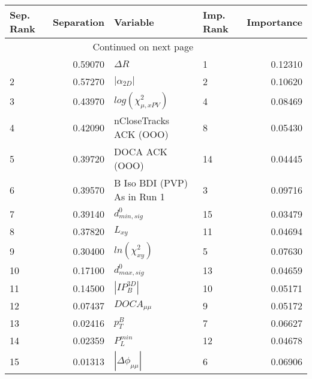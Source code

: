 \usepackage{lscape}

\begin{landscape}
\begin{longtable}{lrllr}
\toprule
Sep. Rank &  Separation &                     Variable & Imp. Rank &  Importance \\
\midrule
\endhead
\midrule
\multicolumn{3}{r}{{Continued on next page}} \\
\midrule
\endfoot

\bottomrule
\endlastfoot
        1 &     0.59070 &                   $\Delta R$ &         1 &     0.12310 \\
        2 &     0.57270 &              $|\alpha_{2D}|$ &         2 &     0.10620 \\
        3 &     0.43970 &    $log(\chi^{2}_{\mu,xPV})$ &         4 &     0.08469 \\
        4 &     0.42090 &       nCloseTracks ACK (OOO) &         8 &     0.05430 \\
        5 &     0.39720 &               DOCA ACK (OOO) &        14 &     0.04445 \\
        6 &     0.39570 &  B Iso BDI (PVP) As in Run 1 &         3 &     0.09716 \\
        7 &     0.39140 &             $d^0_{min, sig}$ &        15 &     0.03479 \\
        8 &     0.37820 &                     $L_{xy}$ &        11 &     0.04694 \\
        9 &     0.30400 &          $ln(\chi^{2}_{xy})$ &         5 &     0.07630 \\
       10 &     0.17100 &             $d^0_{max, sig}$ &        13 &     0.04659 \\
       11 &     0.14500 &              $|IP_{B}^{3D}|$ &        10 &     0.05171 \\
       12 &     0.07437 &              $DOCA_{\mu\mu}$ &         9 &     0.05172 \\
       13 &     0.02416 &                    $p^B_{T}$ &         7 &     0.06627 \\
       14 &     0.02359 &                $P^{min}_{L}$ &        12 &     0.04678 \\
       15 &     0.01313 &     $|\Delta \phi_{\mu\mu}|$ &         6 &     0.06906 \\
\end{longtable}

\end{landscape}
